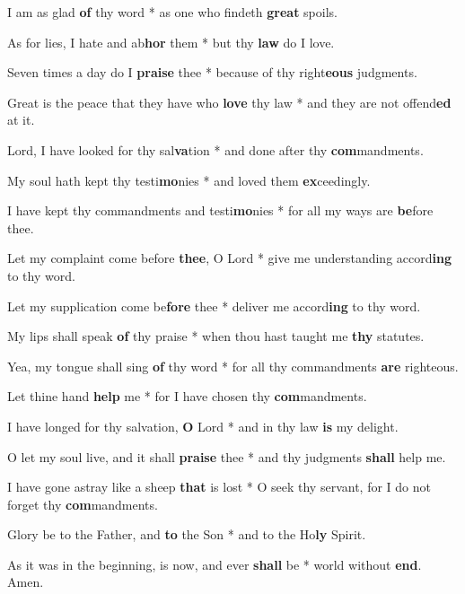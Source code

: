 \begin{multicols}{2}
	I am as glad \textbf{of} thy word * as one who findeth \textbf{great} spoils.
	
	As for lies, I hate and ab\textbf{hor} them * but thy \textbf{law} do I love.
	
	Seven times a day do I \textbf{praise} thee * because of thy right\textbf{eous} judgments.
	
	Great is the peace that they have who \textbf{love} thy law * and they are not offend\textbf{ed} at it.
	
	Lord, I have looked for thy sal\textbf{va}tion * and done after thy \textbf{com}mandments.
	
	My soul hath kept thy testi\textbf{mo}nies * and loved them \textbf{ex}ceedingly.
	
	I have kept thy commandments and testi\textbf{mo}nies * for all my ways are \textbf{be}fore thee.
	
	Let my complaint come before \textbf{thee}, O Lord * give me understanding accord\textbf{ing} to thy word.
	
	Let my supplication come be\textbf{fore} thee * deliver me accord\textbf{ing} to thy word.
	
	My lips shall speak \textbf{of} thy praise * when thou hast taught me \textbf{thy} statutes.
	
	Yea, my tongue shall sing \textbf{of} thy word * for all thy commandments \textbf{are} righteous.
	
	Let thine hand \textbf{help} me * for I have chosen thy \textbf{com}mandments.
	
	I have longed for thy salvation, \textbf{O} Lord * and in thy law \textbf{is} my delight.
	
	O let my soul live, and it shall \textbf{praise} thee * and thy judgments \textbf{shall} help me.
	
	I have gone astray like a sheep \textbf{that} is lost * O seek thy servant, for I do not forget thy \textbf{com}mandments.
	
	Glory be to the Father, and \textbf{to} the Son * and to the Ho\textbf{ly} Spirit.
	
	As it was in the beginning, is now, and ever \textbf{shall} be * world without \textbf{end}. Amen.
\end{multicols}